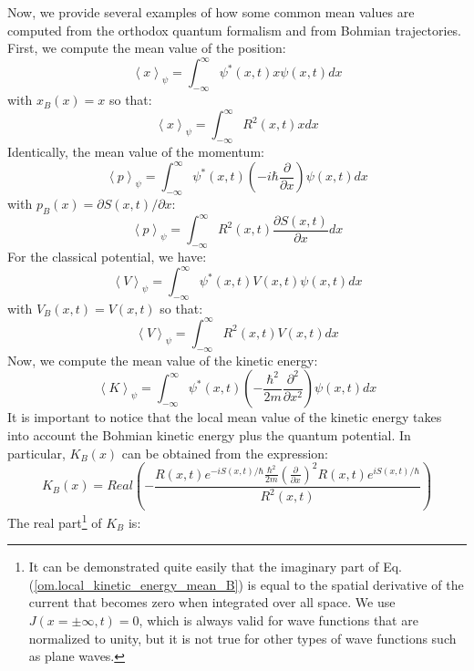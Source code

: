 \documentclass[nofootinbib, secnumarabic, amsmath, nobibnotes,10pt,aps,pra]{revtex4-1}
\newcommand{\eref}[1]{Eq. (\ref{#1})}
\newcommand{\avg}[1]{\left\langle #1 \right\rangle} %
\begin{document}
Now, we provide several examples of how some common mean values are
computed from the orthodox quantum formalism and from Bohmian
trajectories. First, we compute the mean value of the position:
\begin{equation}
\label{om.position_mean_0}
\avg{x}_{\psi} = \int_{-\infty}^{\infty} \psi^{*}(x,t) x \psi(x,t) dx
\end{equation}
with $x_B(x) = x$ so that:
\begin{equation}
\label{om.position_mean_B}
\avg{x}_{\psi} = \int_{-\infty}^{\infty} R^2(x,t) x dx
\end{equation}
Identically, the mean value of the momentum:
\begin{equation}
\label{om.momentum_mean_0}
\avg{p}_{\psi} = \int_{-\infty}^{\infty} \psi^{*}(x,t) \left(-i\hbar \frac {\partial} {\partial x}\right) \psi(x,t) dx
\end{equation}
with $p_B(x) = {\partial S(x,t)}/{\partial x}$:
\begin{equation}
\label{om.momentum_mean_B}
\avg{p}_{\psi} = \int_{-\infty}^{\infty} R^2(x,t) \frac {\partial S(x,t)} {\partial x} dx
\end{equation}
For the classical potential, we have:
\begin{equation}
\label{om.Potential_energy_mean_0}
\avg{V}_{\psi} = \int_{-\infty}^{\infty} \psi^{*}(x,t) V(x,t) \psi(x,t) dx
\end{equation}
with $V_B(x,t) = V(x,t)$ so that:
\begin{equation}
\label{om.Potential_energy_mean_B}
\avg{V}_{\psi} = \int_{-\infty}^{\infty} R^2(x,t) V(x,t) dx
\end{equation}
Now, we compute the mean value of the kinetic energy:
\begin{equation}
\label{om.kinetic_energy_mean_0}
\avg{K}_{\psi} = \int_{-\infty}^{\infty} \psi^{*}(x,t) \left(-\frac {\hbar^2} {2m} \frac {\partial^2} {\partial x^2}\right) \psi(x,t) dx
\end{equation}
It is important to notice that the local mean value of the kinetic
energy takes into account the Bohmian kinetic energy plus the
quantum potential. In particular, $K_B(x)$ can be obtained from the
expression:
\begin{equation}
\label{om.local_kinetic_energy_mean_B}
K_B(x) = Real \left( -\frac {R(x,t) e^{-iS(x,t)/\hbar} \frac{\hbar^2} {2m} \left( \frac {\partial} {\partial x} \right)^2 R(x,t) e^{iS(x,t)/\hbar}} {R^2(x,t)} \right)
\end{equation}
The real part\footnote{It can be demonstrated quite easily that the imaginary part of \eref{om.local_kinetic_energy_mean_B} is equal to the spatial derivative of the current that becomes zero when integrated over all space. We use $J(x = \pm\infty,t) = 0$, which is always valid for wave functions that are normalized to unity, but it is not true for other types of wave functions such as plane waves.} of $K_B$ is:
\end{document}
